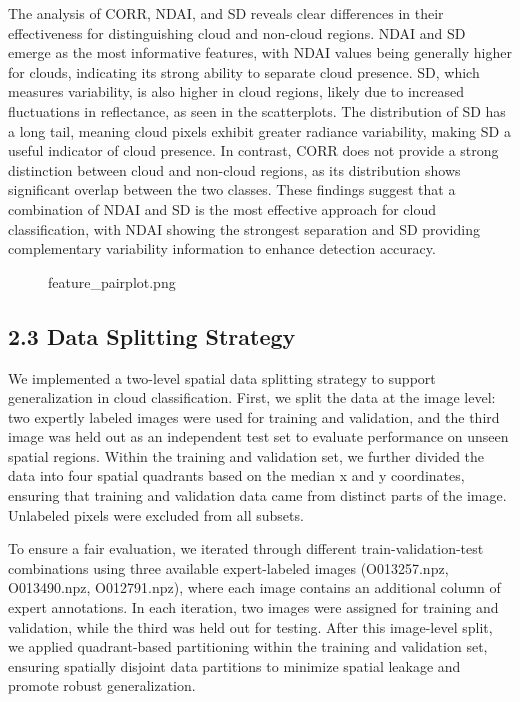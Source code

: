 \documentclass[11pt]{article}
\begin{document}
    The analysis of CORR, NDAI, and SD reveals clear differences in their
effectiveness for distinguishing cloud and non-cloud regions. NDAI and
SD emerge as the most informative features, with NDAI values being
generally higher for clouds, indicating its strong ability to separate
cloud presence. SD, which measures variability, is also higher in cloud
regions, likely due to increased fluctuations in reflectance, as seen in
the scatterplots. The distribution of SD has a long tail, meaning cloud
pixels exhibit greater radiance variability, making SD a useful
indicator of cloud presence. In contrast, CORR does not provide a strong
distinction between cloud and non-cloud regions, as its distribution
shows significant overlap between the two classes. These findings
suggest that a combination of NDAI and SD is the most effective approach
for cloud classification, with NDAI showing the strongest separation and
SD providing complementary variability information to enhance detection
accuracy.

\begin{figure}
\centering
{}
\caption{feature\_pairplot.png}
\end{figure}

    \subsection*{2.3 Data Splitting Strategy}\label{data-splitting-strategy}

We implemented a two-level spatial data splitting strategy to support
generalization in cloud classification. First, we split the data at the
image level: two expertly labeled images were used for training and
validation, and the third image was held out as an independent test set
to evaluate performance on unseen spatial regions. Within the training
and validation set, we further divided the data into four spatial
quadrants based on the median x and y coordinates, ensuring that
training and validation data came from distinct parts of the image.
Unlabeled pixels were excluded from all subsets.

To ensure a fair evaluation, we iterated through different
train-validation-test combinations using three available expert-labeled
images (O013257.npz, O013490.npz, O012791.npz), where each image
contains an additional column of expert annotations. In each iteration,
two images were assigned for training and validation, while the third
was held out for testing. After this image-level split, we applied
quadrant-based partitioning within the training and validation set,
ensuring spatially disjoint data partitions to minimize spatial leakage
and promote robust generalization.
\end{document}
